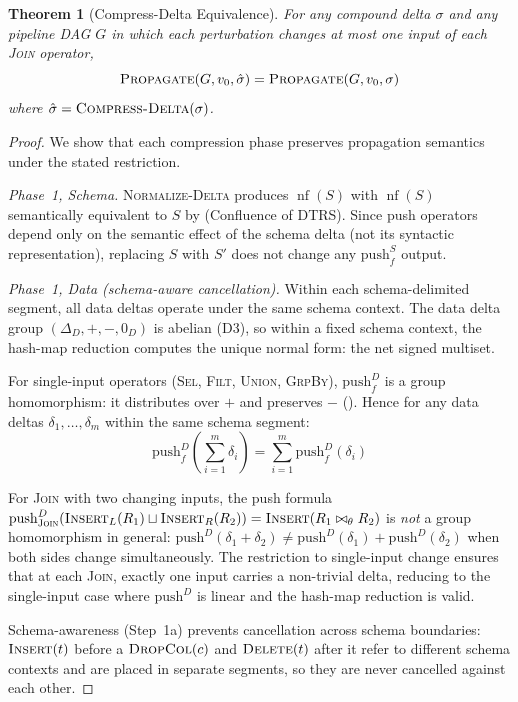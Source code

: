 \documentclass[11pt,a4paper]{article}
\newtheorem{theorem}{Theorem}[section]
\theoremstyle{definition}
\newcommand{\DeltaD}{\Delta_{\!D}}
\newcommand{\zeroD}{0_D}
\newcommand{\push}{\mathrm{push}}
\DeclareMathOperator{\nf}{nf}
\begin{document}
\begin{theorem}[Compress-Delta Equivalence]\label{thm:compress-equiv}
For any compound delta $\sigma$ and any pipeline DAG $G$ in which each
perturbation changes at most one input of each \textsc{Join} operator,
\[
  \textsc{Propagate}(G, v_0, \hat{\sigma})
    = \textsc{Propagate}(G, v_0, \sigma)
\]
where $\hat{\sigma} = \textsc{Compress-Delta}(\sigma)$.
\end{theorem}

\begin{proof}
We show that each compression phase preserves propagation semantics under
the stated restriction.

\emph{Phase~1, Schema.}  \textsc{Normalize-Delta} produces $\nf(S)$ with
$\nf(S)$ semantically equivalent to $S$ by 
(Confluence of DTRS).  Since push operators depend only on the semantic
effect of the schema delta (not its syntactic representation), replacing
$S$ with $S'$ does not change any $\push_f^S$ output.

\emph{Phase~1, Data (schema-aware cancellation).}  Within each
schema-delimited segment, all data deltas operate under the same schema
context.  The data delta group $(\DeltaD, +, -, \zeroD)$ is
abelian (D3), so within a fixed schema context, the hash-map reduction
computes the unique normal form: the net signed multiset.

For single-input operators (\textsc{Sel}, \textsc{Filt}, \textsc{Union},
\textsc{GrpBy}), $\push_f^D$ is a group homomorphism: it distributes over
$+$ and preserves $-$ ().  Hence for any data deltas
$\delta_1, \ldots, \delta_m$ within the same schema segment:
\[
  \push_f^D\!\left(\sum_{i=1}^{m} \delta_i\right)
    = \sum_{i=1}^{m} \push_f^D(\delta_i)
\]

For \textsc{Join} with two changing inputs, the push formula
$\push_{\textsc{Join}}^D(\textsc{Insert}_L(R_1) \sqcup
\textsc{Insert}_R(R_2)) = \textsc{Insert}(R_1 \bowtie_\theta R_2)$
is \emph{not} a group homomorphism in general:
$\push^D(\delta_1 + \delta_2) \neq \push^D(\delta_1) + \push^D(\delta_2)$
when both sides change simultaneously.  The restriction to single-input
change ensures that at each \textsc{Join}, exactly one input carries a
non-trivial delta, reducing to the single-input case where $\push^D$ is
linear and the hash-map reduction is valid.

Schema-awareness (Step~1a) prevents cancellation across schema boundaries:
$\textsc{Insert}(t)$ before a $\textsc{DropCol}(c)$ and
$\textsc{Delete}(t)$ after it refer to different schema contexts and are
placed in separate segments, so they are never cancelled against each other.


\end{proof}
\end{document}
